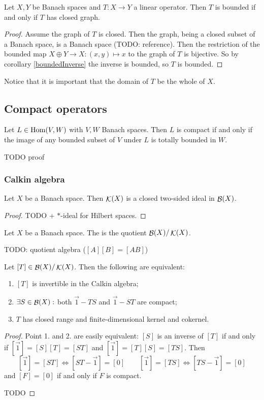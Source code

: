 \begin{theorem} \label{closedGraphTheorem}
Let $X,Y$ be Banach spaces and $T: X\to Y$ a linear operator. Then $T$ is bounded \textup{if and only if} $T$ has closed graph.
\end{theorem}
\begin{proof}
Assume the graph of $T$ is closed. Then the graph, being a closed subset of a Banach space, is a Banach space (TODO: reference). Then the restriction of the bounded map $X\oplus Y \to X: (x,y)\mapsto x$ to the graph of $T$ is bijective. So by corollary \ref{boundedInverse} the inverse is bounded, so $T$ is bounded.
\end{proof}
Notice that it is important that the domain of $T$ be the whole of $X$.


\subsection{Compact operators}
\begin{proposition}
Let $L\in\operatorname{Hom}(V,W)$ with $V,W$ Banach spaces. Then $L$ is compact \textup{if and only if} the image of any bounded subset of $V$ under $L$ is totally bounded in $W$.
\end{proposition}
TODO proof



\subsubsection{Calkin algebra}
\begin{proposition}
Let $X$ be a Banach space. Then $\mathop{\mathcal{K}}(X)$ is a closed two-sided ideal in $\mathop{\mathcal{B}}(X)$.
\end{proposition}
\begin{proof}
TODO + $*$-ideal for Hilbert spaces.
\end{proof}

\begin{definition}
Let $X$ be a Banach space. The  is the quotient $\mathop{\mathcal{B}}(X)/\mathop{\mathcal{K}}(X)$.
\end{definition}
TODO: quotient algebra ($[A][B] = [AB]$)

\begin{proposition}
Let $[T]\in\mathop{\mathcal{B}}(X)/\mathop{\mathcal{K}}(X)$. Then the following are equivalent:
\begin{enumerate}
\item $[T]$ is invertible in the Calkin algebra;
\item $\exists S\in\mathop{\mathcal{B}}(X):$ both $\vec{1}-TS$ and $\vec{1}-ST$ are compact;
\item $T$ has closed range and finite-dimensional kernel and cokernel. 
\end{enumerate}
\end{proposition}
\begin{proof}
Point 1. and 2. are easily equivalent: $[S]$ is an inverse of $[T]$ if and only if $[\vec{1}] = [S][T] = [ST]$ and $[\vec{1}] = [T][S] = [TS]$. Then
\[ [\vec{1}] = [ST] \iff [ST - \vec{1}] = [0] \qquad [\vec{1}] = [TS] \iff [TS - \vec{1}] = [0] \]
and $[F]=[0]$ if and only if $F$ is compact.

TODO
\end{proof}

